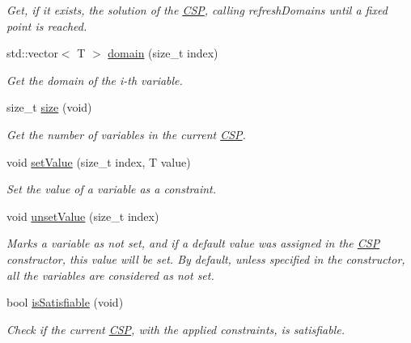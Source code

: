 \begin{DoxyCompactItemize}
\begin{DoxyCompactList}\small\item\em Get, if it exists, the solution of the \hyperlink{classCSP}{CSP}, calling refreshDomains until a fixed point is reached. \item\end{DoxyCompactList}\item 
std::vector$<$ T $>$ \hyperlink{classCSP_ae9db774b971c480cbef66168b9b6cf07}{domain} (size\_\-t index)
\begin{DoxyCompactList}\small\item\em Get the domain of the i-\/th variable. \item\end{DoxyCompactList}\item 
size\_\-t \hyperlink{classCSP_a125c7171c19b99e631926bbe011f127d}{size} (void)
\begin{DoxyCompactList}\small\item\em Get the number of variables in the current \hyperlink{classCSP}{CSP}. \item\end{DoxyCompactList}\item 
void \hyperlink{classCSP_ac25064c5b2d4e1020173b56913251ebd}{setValue} (size\_\-t index, T value)
\begin{DoxyCompactList}\small\item\em Set the value of a variable as a constraint. \item\end{DoxyCompactList}\item 
void \hyperlink{classCSP_a4c0cae125a610f519dc22eaec255a0ae}{unsetValue} (size\_\-t index)
\begin{DoxyCompactList}\small\item\em Marks a variable as not set, and if a default value was assigned in the \hyperlink{classCSP}{CSP} constructor, this value will be set. By default, unless specified in the constructor, all the variables are considered as not set. \item\end{DoxyCompactList}\item 
bool \hyperlink{classCSP_a7ef9eb91c38815c9d82182696a6bd5d3}{isSatisfiable} (void)
\begin{DoxyCompactList}\small\item\em Check if the current \hyperlink{classCSP}{CSP}, with the applied constraints, is satisfiable. \item\end{DoxyCompactList}\item 

\end{DoxyCompactItemize}
